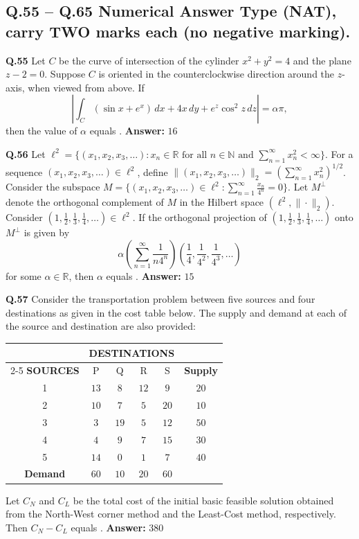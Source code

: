 \documentclass[11pt,a4paper]{article}
\newcommand{\ans}[1]{\textbf{Answer:} #1\par\medskip}
\begin{document}
\subsection*{Q.55 -- Q.65 Numerical Answer Type (NAT), carry TWO marks each (no negative marking).}

\textbf{Q.55} Let $C$ be the curve of intersection of the cylinder $x^2 + y^2 = 4$ and the plane $z - 2 = 0$. Suppose $C$ is oriented in the counterclockwise direction around the $z$-axis, when viewed from above. If
\[
  \left|\int_C (\sin x + e^x)\,dx + 4x\,dy + e^z \cos^2 z\,dz\right| = \alpha\pi,
\]
then the value of $\alpha$ equals \underline{\hspace{2cm}}.
\ans{$16$}

\textbf{Q.56} Let $\ell^2 = \{(x_1, x_2, x_3, \ldots) : x_n \in \mathbb{R} \text{ for all } n \in \mathbb{N} \text{ and } \sum_{n=1}^{\infty} x_n^2 < \infty\}$. For a sequence $(x_1, x_2, x_3, \ldots) \in \ell^2$, define $\|(x_1, x_2, x_3, \ldots)\|_2 = \left(\sum_{n=1}^{\infty} x_n^2\right)^{1/2}$. Consider the subspace $M = \{(x_1, x_2, x_3, \ldots) \in \ell^2 : \sum_{n=1}^{\infty} \frac{x_n}{4^n} = 0\}$. Let $M^\perp$ denote the orthogonal complement of $M$ in the Hilbert space $(\ell^2, \|\cdot\|_2)$. Consider $\left(1, \frac{1}{2}, \frac{1}{3}, \frac{1}{4}, \ldots\right) \in \ell^2$. If the orthogonal projection of $\left(1, \frac{1}{2}, \frac{1}{3}, \frac{1}{4}, \ldots\right)$ onto $M^\perp$ is given by
\[
  \alpha \left(\sum_{n=1}^{\infty} \frac{1}{n 4^n}\right)\left(\frac{1}{4}, \frac{1}{4^2}, \frac{1}{4^3}, \ldots\right)
\]
for some $\alpha \in \mathbb{R}$, then $\alpha$ equals \underline{\hspace{2cm}}.
\ans{$15$}

\textbf{Q.57} Consider the transportation problem between five sources and four destinations as given in the cost table below. The supply and demand at each of the source and destination are also provided:
\begin{center}
\begin{tabular}{cccccc}
\toprule
& \multicolumn{4}{c}{\textbf{DESTINATIONS}} & \\
\cmidrule(lr){2-5}
\textbf{SOURCES} & P & Q & R & S & \textbf{Supply} \\
\midrule
1 & $13$ & $8$ & $12$ & $9$ & $20$ \\
2 & $10$ & $7$ & $5$ & $20$ & $10$ \\
3 & $3$ & $19$ & $5$ & $12$ & $50$ \\
4 & $4$ & $9$ & $7$ & $15$ & $30$ \\
5 & $14$ & $0$ & $1$ & $7$ & $40$ \\
\midrule
\textbf{Demand} & $60$ & $10$ & $20$ & $60$ & \\
\bottomrule
\end{tabular}
\end{center}
Let $C_N$ and $C_L$ be the total cost of the initial basic feasible solution obtained from the North-West corner method and the Least-Cost method, respectively. Then $C_N - C_L$ equals \underline{\hspace{2cm}}.
\ans{$380$}
\end{document}
